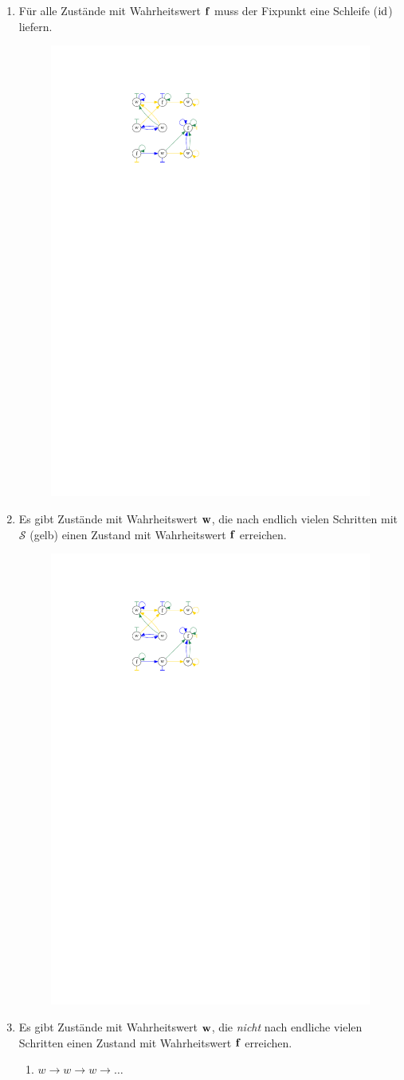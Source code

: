 \begin{enumerate}
    \item Für alle Zustände mit Wahrheitswert $\operatorname{\mathbf{f}}$ muss der Fixpunkt eine Schleife ($\operatorname{id}$) liefern.
        \begin{figure}[H]
            \centering
            \includegraphics[page=2,width=.15\textwidth]{img/f-combined}
        \end{figure}
    \item Es gibt Zustände mit Wahrheitswert $\operatorname{\mathbf{w}}$, die nach endlich vielen Schritten mit $\mathcal{S}$ (gelb) einen Zustand mit Wahrheitswert $\operatorname{\mathbf{f}}$ erreichen.
        \begin{figure}[H]
            \centering
            \includegraphics[page=3,width=.6\textwidth]{img/f-combined}
        \end{figure}
    \item Es gibt Zustände mit Wahrheitswert $\operatorname{\mathbf{w}}$, die \emph{nicht} nach endliche vielen Schritten einen Zustand mit Wahrheitswert $\operatorname{\mathbf{f}}$ erreichen.
        \begin{enumerate}
            \item $w \to w \to w \to \dots$
\begin{lstlisting}[language=Pascal]

\end{lstlisting}
\end{enumerate}
\end{enumerate}
